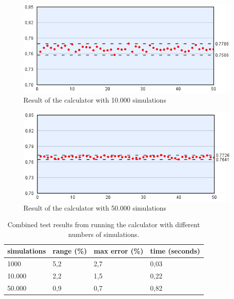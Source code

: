 \begin{figure}[H]
  \center
    \includegraphics[scale=0.775]{images/MonteCarlo/10k.png}
  \caption{Result of the calculator with 10.000 simulations \label{fig:mc10}}
\end{figure}

\begin{figure}[H]
  \center
    \includegraphics[scale=0.775]{images/MonteCarlo/50k.png}
  \caption{Result of the calculator with 50.000 simulations \label{fig:mc50}}
\end{figure}

\vspace{4mm}
\begin{table}[H]
  \center
  \begin{tabular}{ | l | l | l | l | }
    \hline
    simulations & range (\%) & max error (\%) & time (seconds) \\
    \hline                       
    1000 & 5,2 & 2,7 & 0,03 \\
    10.000 & 2,2 & 1,5 & 0,22\\
    50.000 & 0,9 & 0,7 & 0,82\\
  \hline  
  \end{tabular}
  \caption{Combined test results from running the calculator with different numbers of simulations. \label{tab:mc-total}}
\end{table}
\vspace{4mm}

